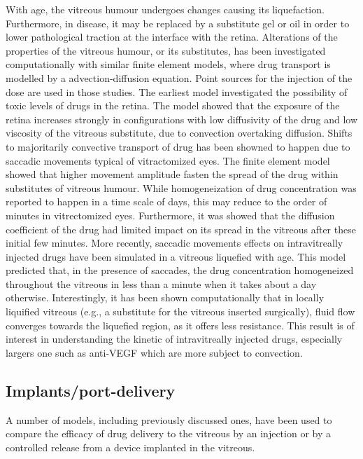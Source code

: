 \documentclass[12pt,a4paper]{journal}
\begin{document}
With age, the vitreous humour undergoes changes causing its liquefaction.
Furthermore, in disease, it may be replaced by a substitute gel or oil in order to lower pathological traction at the interface with the retina.
Alterations of the properties of the vitreous humour, or its substitutes, has been investigated computationally with similar finite element models, where drug transport is modelled by a advection-diffusion equation.\cite{Kathawate_2008,Modareszadeh_2012}
Point sources for the injection of the dose are used in those studies.
The earliest model investigated the possibility of toxic levels of drugs in the retina.\cite{Kathawate_2008}
The model showed that the exposure of the retina increases strongly in configurations with low diffusivity of the drug and low viscosity of the vitreous substitute, due to convection overtaking diffusion.\cite{Kathawate_2008}
Shifts to majoritarily convective transport of drug has been showned to happen due to saccadic movements typical of vitractomized eyes.\cite{Modareszadeh_2012}
The finite element model showed that higher movement amplitude fasten the spread of the drug within substitutes of vitreous humour.
While homogeneization of drug concentration was reported to happen in a time scale of days, this may reduce to the order of minutes in vitrectomized eyes.\cite{Modareszadeh_2012}
Furthermore, it was showed that the diffusion coefficient of the drug had limited impact on its spread in the vitreous after these initial few minutes.\cite{Modareszadeh_2012}
More recently, saccadic movements effects on intravitreally injected drugs have been simulated in a vitreous liquefied with age.\cite{Ferroni_2020}
This model predicted that, in the presence of saccades, the drug concentration homogeneized throughout the vitreous in less than a minute when it takes about a day otherwise.
Interestingly, it has been shown computationally that in locally liquified vitreous (e.g., a substitute for the vitreous inserted surgically), fluid flow converges towards the liquefied region, as it offers less resistance.\cite{Khoobyar_2022}
This result is of interest in understanding the kinetic of intravitreally injected drugs, especially largers one such as anti-VEGF which are more subject to convection.

\subsection*{Implants/port-delivery}

A number of models, including previously discussed ones, have been used to compare the efficacy of drug delivery to the vitreous by an injection or by a controlled release from a device implanted in the vitreous.\cite{Jooybar_2014,Kathawate_2008,Kavousanakis_2014,Park_2005}
\end{document}

